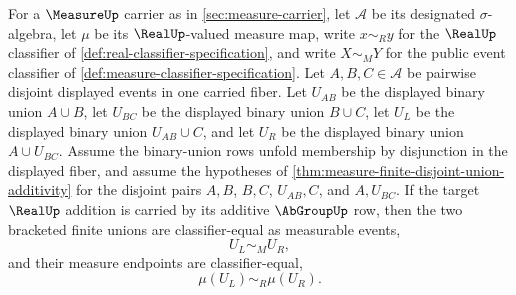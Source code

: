 \begin{theorem}
\label{thm:measure-triple-disjoint-union-associativity}
For a $\MeasureUp$ carrier as in \autoref{sec:measure-carrier}, let
$\mathcal{A}$ be its designated $\sigma$-algebra, let $\mu$ be its
$\RealUp$-valued measure map, write $x\sim_R y$ for the $\RealUp$
classifier of \autoref{def:real-classifier-specification}, and write
$X\sim_M Y$ for the public event classifier of
\autoref{def:measure-classifier-specification}. Let
$A,B,C\in\mathcal{A}$ be pairwise disjoint displayed events in one carried
fiber. Let $U_{AB}$ be the displayed binary union $A\cup B$, let $U_{BC}$ be
the displayed binary union $B\cup C$, let $U_L$ be the displayed binary union
$U_{AB}\cup C$, and let $U_R$ be the displayed binary union $A\cup U_{BC}$.
Assume the binary-union rows unfold membership by disjunction in the displayed
fiber, and assume the hypotheses of
\autoref{thm:measure-finite-disjoint-union-additivity} for the disjoint pairs
$A,B$, $B,C$, $U_{AB},C$, and $A,U_{BC}$. If the target $\RealUp$ addition is
carried by its additive $\AbGroupUp$ row, then the two bracketed finite unions
are classifier-equal as measurable events,
$$
U_L\sim_M U_R,
$$
and their measure endpoints are classifier-equal,
$$
\mu(U_L)\sim_R\mu(U_R).
$$
\end{theorem}
